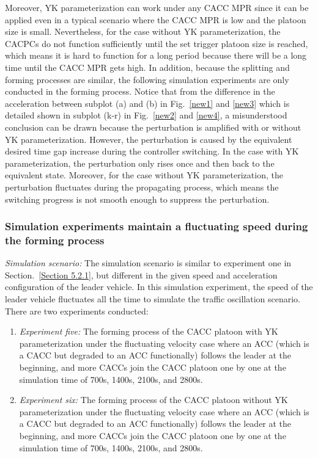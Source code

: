 \documentclass[trsc,nonblindrev]{informs3} %
\begin{document}
Moreover, YK parameterization can work under any CACC MPR since it can be applied even in a typical scenario where the CACC MPR is low and the platoon size is small. Nevertheless, for the case without YK parameterization, the CACPCs do not function sufficiently until the set trigger platoon size is reached, which means it is hard to function for a long period because there will be a long time until the CACC MPR gets high. In addition, because the splitting and forming processes are similar, the following simulation experiments are only conducted in the forming process. Notice that from the difference in the acceleration between subplot (a) and (b) in Fig.~\ref{new1} and \ref{new3} which is detailed shown in subplot (k-r) in Fig.~\ref{new2} and \ref{new4}, a misunderstood conclusion can be drawn because the perturbation is amplified with or without YK parameterization. However, the perturbation is caused by the equivalent desired time gap increase during the controller switching. In the case with YK parameterization, the perturbation only rises once and then back to the equivalent state. Moreover, for the case without YK parameterization, the perturbation fluctuates during the propagating process, which means the switching progress is not smooth enough to suppress the perturbation.

\subsubsection{Simulation experiments maintain a fluctuating speed during the forming process}
\label{Section 5.2.2}

\textit{Simulation scenario:} The simulation scenario is similar to experiment one in Section.~\ref{Section 5.2.1}, but different in the given speed and acceleration configuration of the leader vehicle. In this simulation experiment, the speed of the leader vehicle fluctuates all the time to simulate the traffic oscillation scenario. There are two experiments conducted:
\begin{enumerate}
    \item \textit{Experiment five:} The forming process of the CACC platoon with YK parameterization under the fluctuating velocity case where an ACC (which is a CACC but degraded to an ACC functionally) follows the leader at the beginning, and more CACCs join the CACC platoon one by one at the simulation time of 700s, 1400s, 2100s, and 2800s.
    \item \textit{Experiment six:} The forming process of the CACC platoon without YK parameterization under the fluctuating velocity case where an ACC (which is a CACC but degraded to an ACC functionally) follows the leader at the beginning, and more CACCs join the CACC platoon one by one at the simulation time of 700s, 1400s, 2100s, and 2800s.
\end{enumerate}
\end{document}
